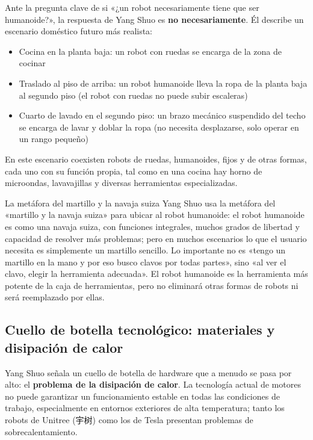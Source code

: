 \documentclass[a4paper]{article}
\begin{document}
Ante la pregunta clave de si «¿un robot necesariamente tiene que ser humanoide?», la respuesta de Yang Shuo es \textbf{no necesariamente}. Él describe un escenario doméstico futuro más realista:

\begin{itemize}
    \item Cocina en la planta baja: un robot con ruedas se encarga de la zona de cocinar
    \item Traslado al piso de arriba: un robot humanoide lleva la ropa de la planta baja al segundo piso (el robot con ruedas no puede subir escaleras)
    \item Cuarto de lavado en el segundo piso: un brazo mecánico suspendido del techo se encarga de lavar y doblar la ropa (no necesita desplazarse, solo operar en un rango pequeño)
\end{itemize}

En este escenario coexisten robots de ruedas, humanoides, fijos y de otras formas, cada uno con su función propia, tal como en una cocina hay horno de microondas, lavavajillas y diversas herramientas especializadas.

\begin{warningbox}{La metáfora del martillo y la navaja suiza}
Yang Shuo usa la metáfora del «martillo y la navaja suiza» para ubicar al robot humanoide: el robot humanoide es como una navaja suiza, con funciones integrales, muchos grados de libertad y capacidad de resolver más problemas; pero en muchos escenarios lo que el usuario necesita es simplemente un martillo sencillo. Lo importante no es «tengo un martillo en la mano y por eso busco clavos por todas partes», sino «al ver el clavo, elegir la herramienta adecuada». El robot humanoide es la herramienta más potente de la caja de herramientas, pero no eliminará otras formas de robots ni será reemplazado por ellas.
\end{warningbox}

\subsection{Cuello de botella tecnológico: materiales y disipación de calor}

Yang Shuo señala un cuello de botella de hardware que a menudo se pasa por alto: el \textbf{problema de la disipación de calor}. La tecnología actual de motores no puede garantizar un funcionamiento estable en todas las condiciones de trabajo, especialmente en entornos exteriores de alta temperatura; tanto los robots de Unitree (宇树) como los de Tesla presentan problemas de sobrecalentamiento.
\end{document}
